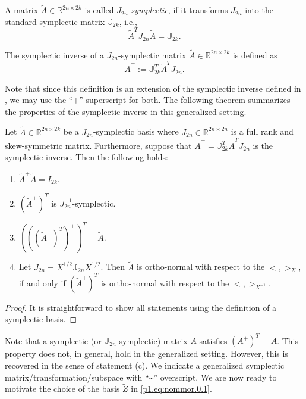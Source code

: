 \begin{definition}
A matrix $\tilde A\in \mathbb R^{2n\times 2k}$ is called \emph{$J_{2n}$-symplectic}, if it transforms $J_{2n}$ into the standard symplectic matrix $\mathbb J_{2k}$, i.e.,
\begin{equation} \label{p1.eq:nommor.0.3}
	\tilde A^T J_{2n} \tilde A = \mathbb J_{2k}.
\end{equation}
\end{definition}

\begin{definition}
The symplectic inverse of a $J_{2n}$-symplectic matrix $\tilde A\in \mathbb R^{2n\times 2k}$ is defined as
\begin{equation} \label{p1.eq:nommor.0.4}
	\tilde A^{+} := \mathbb J_{2k}^T \tilde A^T J_{2n}.
\end{equation}
\end{definition}
Note that since this definition is an extension of the symplectic inverse defined in \cite{doi:10.1137/140978922}, we may use the ``$+$'' superscript for both. The following theorem summarizes the properties of the symplectic inverse in this generalized setting.

\begin{proposition} \label{thm:4.1}
Let $\tilde A\in \mathbb R^{2n\times 2k}$ be a $J_{2n}$-symplectic basis where $J_{2n}\in\mathbb R^{2n\times 2n}$ is a full rank and skew-symmetric matrix. Furthermore, suppose that $\tilde A^{+} = \mathbb{J}_{2k}^T \tilde A^T J_{2n}$ is the symplectic inverse. Then the following holds:
\begin{enumerate}[$\qquad$(a)]
\item $\tilde A^+ \tilde A = I_{2k}$.
\item $(\tilde A^+)^T$ is $J_{2n}^{-1}$-symplectic.
\item $\left(\left(\left(\tilde A^+\right)^T\right)^+\right)^T = \tilde A$.
\item Let $J_{2n}=X^{1/2}\mathbb J_{2n} X^{1/2}$. Then $\tilde A$ is ortho-normal with respect to the $<,>_X$, if and only if $(\tilde A^+)^T$ is ortho-normal with respect to the $<,>_{X^{-1}}$.
\end{enumerate}
\end{proposition}
\begin{proof}
It is straightforward to show all statements using the definition of a symplectic basis.
\end{proof}

Note that a symplectic (or $\mathbb J_{2n}$-symplectic) matrix $A$ satisfies $(A^+)^T = A$. This property does not, in general, hold in the generalized setting. However, this is recovered in the sense of statement (c). We indicate a generalized symplectic matrix/transformation/subspace with ``\textasciitilde'' overscript. We are now ready to motivate the choice of the basis $\tilde Z$ in \eqref{p1.eq:nommor.0.1}.

